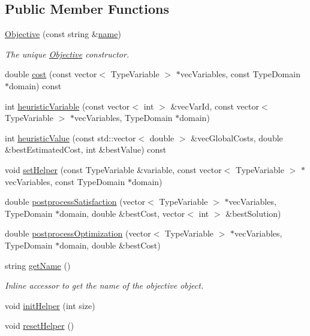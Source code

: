 \subsection*{Public Member Functions}
\begin{DoxyCompactItemize}
\item 
\hyperlink{classghost_1_1Objective_a40decf80e2a1f37e2cc4634f41acc7ca}{Objective} (const string \&\hyperlink{classghost_1_1Objective_ae9533a52b3600c826df6e20c65db1e7a}{name})
\begin{DoxyCompactList}\small\item\em The unique \hyperlink{classghost_1_1Objective}{Objective} constructor. \end{DoxyCompactList}\item 
double \hyperlink{classghost_1_1Objective_a2947c19e26ffd2a23c3a7f1b99c8bc79}{cost} (const vector$<$ Type\-Variable $>$ $\ast$vec\-Variables, const Type\-Domain $\ast$domain) const 
\item 
int \hyperlink{classghost_1_1Objective_af68c07a226162ea7f9ee01a0b00d3ae4}{heuristic\-Variable} (const vector$<$ int $>$ \&vec\-Var\-Id, const vector$<$ Type\-Variable $>$ $\ast$vec\-Variables, Type\-Domain $\ast$domain)
\item 
int \hyperlink{classghost_1_1Objective_ac9d6c8e05cca99cd797d302b3755b6b5}{heuristic\-Value} (const std\-::vector$<$ double $>$ \&vec\-Global\-Costs, double \&best\-Estimated\-Cost, int \&best\-Value) const 
\item 
void \hyperlink{classghost_1_1Objective_ab589c264cf391bab9005562f66a39797}{set\-Helper} (const Type\-Variable \&variable, const vector$<$ Type\-Variable $>$ $\ast$vec\-Variables, const Type\-Domain $\ast$domain)
\item 
double \hyperlink{classghost_1_1Objective_ac4a32cc45835534a3cc16cf05f77ca34}{postprocess\-Satisfaction} (vector$<$ Type\-Variable $>$ $\ast$vec\-Variables, Type\-Domain $\ast$domain, double \&best\-Cost, vector$<$ int $>$ \&best\-Solution)
\item 
double \hyperlink{classghost_1_1Objective_a78ac0f829786f02fe69b2afe6f2636bc}{postprocess\-Optimization} (vector$<$ Type\-Variable $>$ $\ast$vec\-Variables, Type\-Domain $\ast$domain, double \&best\-Cost)
\item 
string \hyperlink{classghost_1_1Objective_adfe2130d5a472771544a4033e457c4bb}{get\-Name} ()
\begin{DoxyCompactList}\small\item\em Inline accessor to get the name of the objective object. \end{DoxyCompactList}\item 
void \hyperlink{classghost_1_1Objective_ad4432d190d227f7e67bd505f0b4b80e9}{init\-Helper} (int size)
\item 
void \hyperlink{classghost_1_1Objective_a76ca30dd5fc977963058f0c3abfe100a}{reset\-Helper} ()
\end{DoxyCompactItemize}
